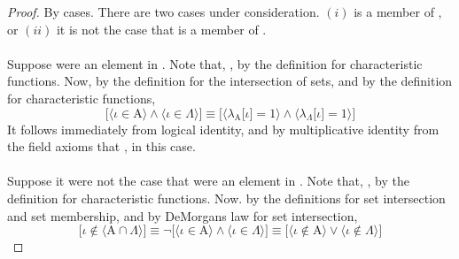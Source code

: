 \documentclass[preview]{standalone}
\begin{document}
\begin{proof}
    By cases. There are two cases under consideration. 
    $(i)$ \bm{$\iota$} is a member of , or 
    $(ii)$ it is not the case that \bm{$\iota$} is a member of .
    \\ \\
     Suppose \bm{$\iota$} were an element in .
    Note that, 
    ,
    by the definition for characteristic functions.
    Now, by the definition for the intersection of sets, 
    and by the definition for characteristic functions,
    \begin{equation*}
        \bigg[
            \Big \langle \iota \in \mathrm{A} \Big \rangle 
                \land 
            \Big \langle \iota \in \Lambda \Big \rangle
        \bigg]
            \equiv
        \bigg[
            \Big \langle \lambda_\mathrm{A} \big[ \iota \big] = 1 \Big \rangle
                \land
            \Big \langle \lambda_{\Lambda} \big[ \iota \big] = 1 \Big \rangle
        \bigg]
    \end{equation*}
    It follows immediately from logical identity, 
    and by multiplicative identity 
    from the field axioms that 
    , in this case.
    \\ \\
     Suppose it were not the case that \bm{$\iota$} were an element in 
    .
    Note that, ,
    by the definition for characteristic functions.
    Now. by the definitions for set intersection and set membership, 
    and by DeMorgans law for set intersection,
    \begin{equation*}
        \bigg[
            \iota \notin \Big \langle 
                \mathrm{A} \cap \Lambda 
            \Big \rangle
        \bigg]
            \equiv
        \lnot \bigg[
            \Big \langle \iota \in \mathrm{A} \Big \rangle
                \land
            \Big \langle \iota \in \Lambda \Big \rangle
        \bigg]
            \equiv
        \bigg[
            \Big \langle \iota \notin \mathrm{A} \Big \rangle
                \lor
            \Big \langle \iota \notin \Lambda \Big \rangle
        \bigg]

\end{equation*}
\end{proof}
\end{document}

